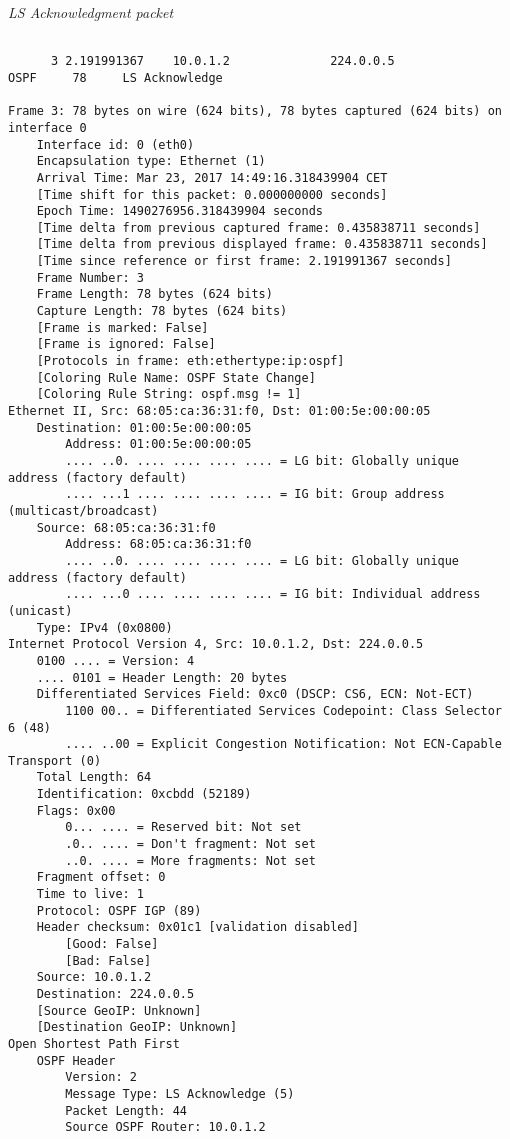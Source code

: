 \textit{LS Acknowledgment packet} 
\begin{lstlisting}

      3 2.191991367    10.0.1.2              224.0.0.5             OSPF     78     LS Acknowledge

Frame 3: 78 bytes on wire (624 bits), 78 bytes captured (624 bits) on interface 0
    Interface id: 0 (eth0)
    Encapsulation type: Ethernet (1)
    Arrival Time: Mar 23, 2017 14:49:16.318439904 CET
    [Time shift for this packet: 0.000000000 seconds]
    Epoch Time: 1490276956.318439904 seconds
    [Time delta from previous captured frame: 0.435838711 seconds]
    [Time delta from previous displayed frame: 0.435838711 seconds]
    [Time since reference or first frame: 2.191991367 seconds]
    Frame Number: 3
    Frame Length: 78 bytes (624 bits)
    Capture Length: 78 bytes (624 bits)
    [Frame is marked: False]
    [Frame is ignored: False]
    [Protocols in frame: eth:ethertype:ip:ospf]
    [Coloring Rule Name: OSPF State Change]
    [Coloring Rule String: ospf.msg != 1]
Ethernet II, Src: 68:05:ca:36:31:f0, Dst: 01:00:5e:00:00:05
    Destination: 01:00:5e:00:00:05
        Address: 01:00:5e:00:00:05
        .... ..0. .... .... .... .... = LG bit: Globally unique address (factory default)
        .... ...1 .... .... .... .... = IG bit: Group address (multicast/broadcast)
    Source: 68:05:ca:36:31:f0
        Address: 68:05:ca:36:31:f0
        .... ..0. .... .... .... .... = LG bit: Globally unique address (factory default)
        .... ...0 .... .... .... .... = IG bit: Individual address (unicast)
    Type: IPv4 (0x0800)
Internet Protocol Version 4, Src: 10.0.1.2, Dst: 224.0.0.5
    0100 .... = Version: 4
    .... 0101 = Header Length: 20 bytes
    Differentiated Services Field: 0xc0 (DSCP: CS6, ECN: Not-ECT)
        1100 00.. = Differentiated Services Codepoint: Class Selector 6 (48)
        .... ..00 = Explicit Congestion Notification: Not ECN-Capable Transport (0)
    Total Length: 64
    Identification: 0xcbdd (52189)
    Flags: 0x00
        0... .... = Reserved bit: Not set
        .0.. .... = Don't fragment: Not set
        ..0. .... = More fragments: Not set
    Fragment offset: 0
    Time to live: 1
    Protocol: OSPF IGP (89)
    Header checksum: 0x01c1 [validation disabled]
        [Good: False]
        [Bad: False]
    Source: 10.0.1.2
    Destination: 224.0.0.5
    [Source GeoIP: Unknown]
    [Destination GeoIP: Unknown]
Open Shortest Path First
    OSPF Header
        Version: 2
        Message Type: LS Acknowledge (5)
        Packet Length: 44
        Source OSPF Router: 10.0.1.2

\end{lstlisting}
